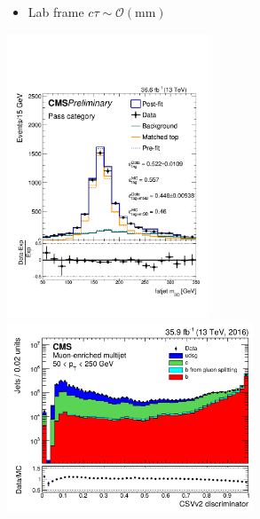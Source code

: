\documentclass[aspectratio=169,xcolor=dvipsnames,,table,compress]{beamer}
\begin{document}
\begin{frame}[t]
\begin{columns}[T]
\begin{column}{0.5\textwidth}
\begin{itemize}
\begin{itemize}
        \begin{itemize}
          \item Lab frame $c\tau \sim \mathcal{O} (\mathrm{mm})$
        \end{itemize}
      \end{itemize}
    \end{itemize}
    \centering
    \vspace{-5mm}
    \hspace{-40mm}
      \includegraphics[width=0.45\textwidth]{../figures/toptagging/sf/tight_pass.pdf}
      \includegraphics[width=0.55\textwidth]{../figures/cms/csvv2.png}
  \end{column}
  \end{columns}
\end{frame}
\end{document}
